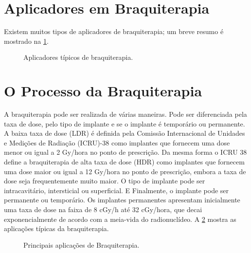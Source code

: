 \documentclass[11pt,a4paper]{article}
\begin{document}
\section{Aplicadores em Braquiterapia}

	Existem muitos tipos de aplicadores de braquiterapia; um breve resumo é mostrado na \ref{fig:aplicadoresTipicos}.

	\begin{figure}[h]
		\centering
		\caption{Aplicadores típicos de braquiterapia.}
		\label{fig:aplicadoresTipicos}
	\end{figure}

\section{O Processo da Braquiterapia}

	A braquiterapia pode ser realizada de várias maneiras. Pode ser diferenciada pela taxa de dose, pelo tipo de implante e se o implante é temporário ou permanente. A baixa taxa de dose (LDR) é definida pela Comissão Internacional de Unidades e Medições de Radiação (ICRU)-38 como implantes que fornecem uma dose menor ou igual a 2 Gy/hora no ponto de prescrição. Da mesma forma o ICRU 38 define a braquiterapia de alta taxa de dose (HDR) como  implantes que fornecem uma dose maior ou igual a 12 Gy/hora no ponto de prescrição, embora a taxa de dose seja frequentemente muito maior. O tipo de implante pode ser intracavitário, intersticial ou superficial. E Finalmente, o implante pode ser permanente ou temporário. Os implantes permanentes apresentam inicialmente uma taxa de dose na faixa de 8 cGy/h até 32 cGy/hora, que decai exponencialmente de acordo com a meia-vida do radionuclídeo. A \ref{fig:aplicacoesDeBraquiterapia} mostra as aplicações típicas da braquiterapia.

	\begin{figure}[h]
		\centering
		\caption{Principais aplicações de Braquiterapia.}
		\label{fig:aplicacoesDeBraquiterapia}
	\end{figure}
\end{document}

